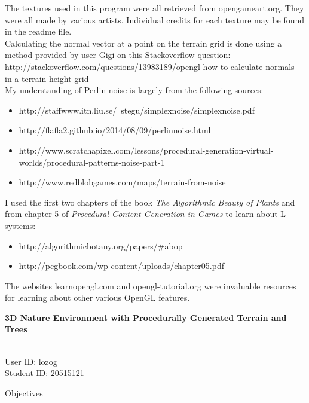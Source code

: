\documentclass{article}
\newcommand\projecttitle{3D Nature Environment with Procedurally Generated Terrain and Trees}
\newcommand\myname{Liam Ozog}
\newcommand\myuserid{lozog}
\newcommand\mystudentid{20515121}
\begin{document}
The textures used in this program were all retrieved from opengameart.org. They were all made by various artists. Individual credits for each texture may be found in the readme file.
\\

Calculating the normal vector at a point on the terrain grid is done using a method provided by user Gigi
 on this Stackoverflow question: http://stackoverflow.com/questions/13983189/opengl-how-to-calculate-normals-in-a-terrain-height-grid
\\

My understanding of Perlin noise is largely from the following sources:
\begin{itemize}
\item http://staffwww.itn.liu.se/~stegu/simplexnoise/simplexnoise.pdf
\item http://flafla2.github.io/2014/08/09/perlinnoise.html
\item http://www.scratchapixel.com/lessons/procedural-generation-virtual-worlds/procedural-patterns-noise-part-1
\item http://www.redblobgames.com/maps/terrain-from-noise
\end{itemize}


I used the first two chapters of the book \textit{The Algorithmic Beauty of Plants} and from chapter 5 of \textit{Procedural Content Generation in Games} to learn about L-systems:
\begin{itemize}
\item http://algorithmicbotany.org/papers/\#abop
\item http://pcgbook.com/wp-content/uploads/chapter05.pdf
\end{itemize}


The websites learnopengl.com and opengl-tutorial.org were invaluable resources for learning about other various OpenGL features.

\newpage

{\noindent \huge \bf 
	\projecttitle 
}

\medskip
\noindent{Name: \myname} \\ 
User ID: \myuserid \\ 
Student ID: \mystudentid 

\bigskip
{\noindent\Large Objectives}
\end{document}
